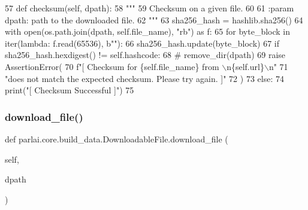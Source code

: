 \begin{DoxyCode}
57     \textcolor{keyword}{def }checksum(self, dpath):
58         \textcolor{stringliteral}{"""}
59 \textcolor{stringliteral}{        Checksum on a given file.}
60 \textcolor{stringliteral}{}
61 \textcolor{stringliteral}{        :param dpath: path to the downloaded file.}
62 \textcolor{stringliteral}{        """}
63         sha256\_hash = hashlib.sha256()
64         with open(os.path.join(dpath, self.file\_name), \textcolor{stringliteral}{"rb"}) \textcolor{keyword}{as} f:
65             \textcolor{keywordflow}{for} byte\_block \textcolor{keywordflow}{in} iter(\textcolor{keyword}{lambda}: f.read(65536), b\textcolor{stringliteral}{""}):
66                 sha256\_hash.update(byte\_block)
67             \textcolor{keywordflow}{if} sha256\_hash.hexdigest() != self.hashcode:
68                 \textcolor{comment}{# remove\_dir(dpath)}
69                 \textcolor{keywordflow}{raise} AssertionError(
70                     f\textcolor{stringliteral}{"[ Checksum for \{self.file\_name\} from \(\backslash\)n\{self.url\}\(\backslash\)n"}
71                     \textcolor{stringliteral}{"does not match the expected checksum. Please try again. ]"}
72                 )
73             \textcolor{keywordflow}{else}:
74                 print(\textcolor{stringliteral}{"[ Checksum Successful ]"})
75 
\end{DoxyCode}
\mbox{\label{classparlai_1_1core_1_1build__data_1_1DownloadableFile_a2d7ae322b78f070c78050cbb41636bd4}} 
\subsubsection{\texorpdfstring{download\+\_\+file()}{download\_file()}}
{\footnotesize\ttfamily def parlai.\+core.\+build\+\_\+data.\+Downloadable\+File.\+download\+\_\+file (\begin{DoxyParamCaption}\item[{}]{self,  }\item[{}]{dpath }\end{DoxyParamCaption})}



